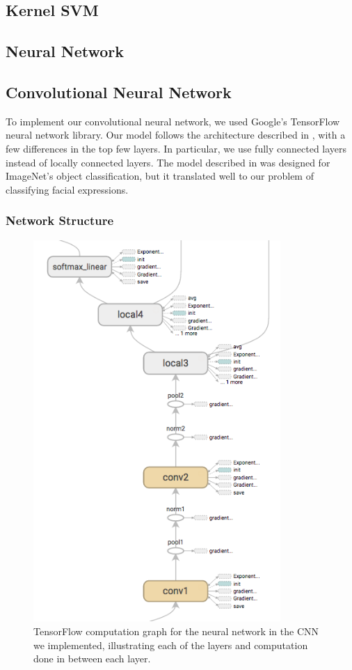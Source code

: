 \documentclass[11pt, twocolumn, twoside]{article}
\begin{document}
\subsection{Kernel SVM}

\subsection{Neural Network}

\subsection{Convolutional Neural Network}

To implement our convolutional neural network, we used Google's TensorFlow neural network library.
Our model follows the architecture described in \cite{Krizhevsky}, with a few differences in the top few layers.
In particular, we use fully connected layers instead of locally connected layers. The model described in
\cite{Krizhevsky} was designed for ImageNet's object classification, but it translated well to our problem of classifying facial expressions.

\subsubsection{Network Structure}

\begin{figure}
	\centering
	\includegraphics[width=3.7in]{inference_graph}
	\caption{TensorFlow computation graph for the neural network in the CNN we implemented, illustrating each of the layers and computation done in between each layer.}
	\label{fig:inference}
\end{figure}
\end{document}
